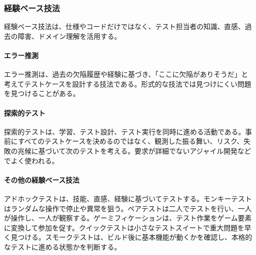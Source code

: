 \subsubsection{経験ベース技法}
経験ベース技法は、仕様やコードだけではなく、テスト担当者の知識、直感、過去の障害、ドメイン理解を活用する。

\paragraph{エラー推測}
エラー推測は、過去の欠陥履歴や経験に基づき、「ここに欠陥がありそうだ」と考えてテストケースを設計する技法である。形式的な技法では見つけにくい問題を見つけることがある。

\paragraph{探索的テスト}
探索的テストは、学習、テスト設計、テスト実行を同時に進める活動である。事前にすべてのテストケースを決めるのではなく、観測した振る舞い、リスク、失敗の兆候に基づいて次のテストを考える。要求が詳細でないアジャイル開発などでよく使われる。

\paragraph{その他の経験ベース技法}
アドホックテストは、技能、直感、経験に基づいてテストする。モンキーテストはランダムな操作で停止や異常を狙う。ペアテストは二人でテストを行い、一人が操作し、一人が観察する。ゲーミフィケーションは、テスト作業をゲーム要素に変換して参加を促す。クイックテストは小さなテストスイートで重大問題を早く見つける。スモークテストは、ビルド後に基本機能が動くかを確認し、本格的なテストに進める状態かを判断する。
